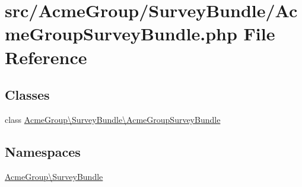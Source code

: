 \hypertarget{_acme_group_survey_bundle_8php}{\section{src/\+Acme\+Group/\+Survey\+Bundle/\+Acme\+Group\+Survey\+Bundle.php File Reference}
\label{_acme_group_survey_bundle_8php}
}
\subsection*{Classes}
\begin{DoxyCompactItemize}
\item 
class \hyperlink{class_acme_group_1_1_survey_bundle_1_1_acme_group_survey_bundle}{Acme\+Group\textbackslash{}\+Survey\+Bundle\textbackslash{}\+Acme\+Group\+Survey\+Bundle}
\end{DoxyCompactItemize}
\subsection*{Namespaces}
\begin{DoxyCompactItemize}
\item 
 \hyperlink{namespace_acme_group_1_1_survey_bundle}{Acme\+Group\textbackslash{}\+Survey\+Bundle}
\end{DoxyCompactItemize}
